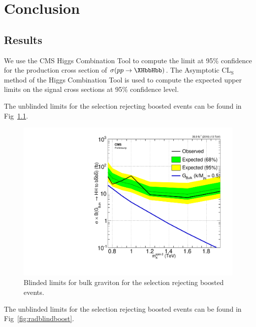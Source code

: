 \chapter{Conclusion}\label{Sec:Ana}

\section{Results\label{sec:Results}}

We use the CMS Higgs Combination Tool to compute the limit at 95\% confidence for the production cross section of $\sigma(pp\to\XHbbHbb)$. 
The Asymptotic $\mathrm{CL_S}$ method of the Higgs Combination Tool is used to compute the expected upper limits on 
the signal cross sections at 95\% confidence level. 

The unblinded limits for the selection rejecting boosted events can be found in Fig~\ref{fig:BGblindboost}.

\begin{figure}[thb!]
\begin{center}
\includegraphics[scale=0.5]{F5/brazilianFlag_2p1BGboost_HH4b2p1_HH4b2p1_13TeV.pdf}
\end{center}
\caption{Blinded limits for bulk graviton for the selection rejecting boosted events.}
\label{fig:BGblindboost}
\end{figure} 

The unblinded limits for the selection rejecting boosted events can be found in Fig~\ref{fig:radblindboost}.

